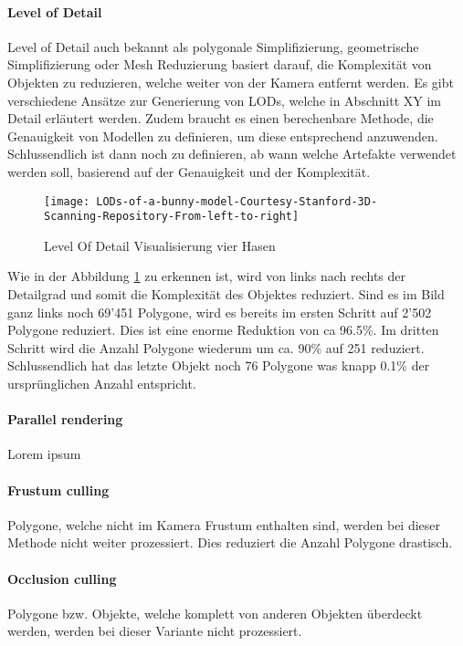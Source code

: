 \paragraph{Level of Detail}
Level of Detail auch bekannt als polygonale Simplifizierung, geometrische Simplifizierung oder Mesh Reduzierung basiert darauf, die Komplexität von Objekten zu reduzieren, welche weiter von der Kamera entfernt werden. Es gibt verschiedene Ansätze zur Generierung von LODs, welche in Abschnitt XY im Detail erläutert werden. Zudem braucht es einen berechenbare Methode, die Genauigkeit von Modellen zu definieren, um diese entsprechend anzuwenden. Schlussendlich ist dann noch zu definieren, ab wann welche Artefakte verwendet werden soll, basierend auf der Genauigkeit und der Komplexität.

\begin{figure}[H]
\centering
\texttt{[image: LODs-of-a-bunny-model-Courtesy-Stanford-3D-Scanning-Repository-From-left-to-right]}
\caption{Level Of Detail Visualisierung vier Hasen}
\label{fig:LevelOfDetailVisualisierungvierHasen}
\end{figure}

Wie in der Abbildung \ref{fig:LevelOfDetailVisualisierungvierHasen} zu erkennen ist, wird von links nach rechts der Detailgrad und somit die Komplexität des Objektes reduziert. Sind es im Bild ganz links noch 69'451 Polygone, wird es bereits im ersten Schritt auf 2'502 Polygone reduziert. Dies ist eine enorme Reduktion von ca 96.5\%. Im dritten Schritt wird die Anzahl Polygone wiederum um ca. 90\% auf 251 reduziert. Schlussendlich hat das letzte Objekt noch 76 Polygone was knapp 0.1\% der ursprünglichen Anzahl entspricht.

\paragraph{Parallel rendering}
Lorem ipsum

\paragraph{Frustum culling}
Polygone, welche nicht im Kamera Frustum enthalten sind, werden bei dieser Methode nicht weiter prozessiert.
Dies reduziert die Anzahl Polygone drastisch.

\paragraph{Occlusion culling}
Polygone bzw. Objekte, welche komplett von anderen Objekten überdeckt werden, werden bei dieser Variante nicht prozessiert.

